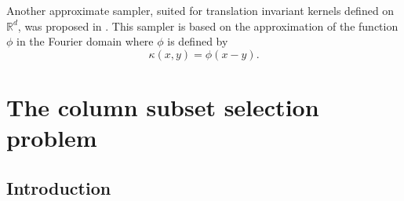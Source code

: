 \documentclass[twoside,11pt]{book}
\numberwithin{theorem}{chapter}
\numberwithin{definition}{chapter}
\numberwithin{proposition}{chapter}
\numberwithin{corollary}{chapter}
\numberwithin{example}{chapter}
\numberwithin{lemma}{chapter}
\numberwithin{assumption}{chapter}
\begin{document}
 Another approximate sampler, suited for translation invariant kernels defined on $\mathbb{R}^{d}$, was proposed in \citep{LaMoRu15}. This sampler is based on the approximation of the function $\phi$ in the Fourier domain where $\phi$ is defined by
 \begin{equation}
 \kappa(x,y) = \phi(x-y).
 \end{equation}










\chapter{The column subset selection problem}\label{chapter:cssp}
\section{Introduction}


\end{document}
